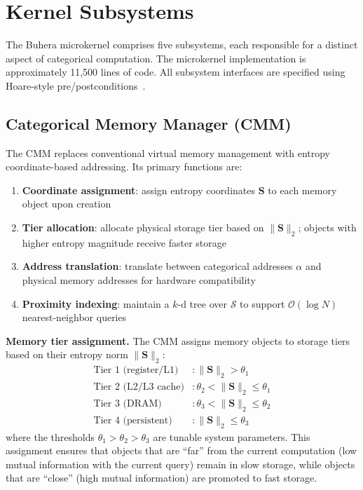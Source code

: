\documentclass[12pt,twocolumn]{article}
\begin{document}
\section{Kernel Subsystems}
\label{sec:subsystems}

The Buhera microkernel comprises five subsystems, each responsible for a distinct aspect of categorical computation. The microkernel implementation is approximately 11,500 lines of code. All subsystem interfaces are specified using Hoare-style pre/postconditions~\cite{hoare1969axiomatic}.

\subsection{Categorical Memory Manager (CMM)}

The CMM replaces conventional virtual memory management with entropy coordinate-based addressing. Its primary functions are:

\begin{enumerate}
\item \textbf{Coordinate assignment}: assign entropy coordinates $\mathbf{S}$ to each memory object upon creation
\item \textbf{Tier allocation}: allocate physical storage tier based on $\|\mathbf{S}\|_2$; objects with higher entropy magnitude receive faster storage
\item \textbf{Address translation}: translate between categorical addresses $\alpha$ and physical memory addresses for hardware compatibility
\item \textbf{Proximity indexing}: maintain a $k$-d tree over $\mathcal{S}$ to support $\mathcal{O}(\log N)$ nearest-neighbor queries
\end{enumerate}

\textbf{Memory tier assignment.} The CMM assigns memory objects to storage tiers based on their entropy norm $\|\mathbf{S}\|_2$:
\begin{align}
\text{Tier 1 (register/L1)} &: \|\mathbf{S}\|_2 > \theta_1 \\
\text{Tier 2 (L2/L3 cache)} &: \theta_2 < \|\mathbf{S}\|_2 \leq \theta_1 \\
\text{Tier 3 (DRAM)}        &: \theta_3 < \|\mathbf{S}\|_2 \leq \theta_2 \\
\text{Tier 4 (persistent)}  &: \|\mathbf{S}\|_2 \leq \theta_3
\end{align}
where the thresholds $\theta_1 > \theta_2 > \theta_3$ are tunable system parameters. This assignment ensures that objects that are ``far'' from the current computation (low mutual information with the current query) remain in slow storage, while objects that are ``close'' (high mutual information) are promoted to fast storage.
\end{document}
